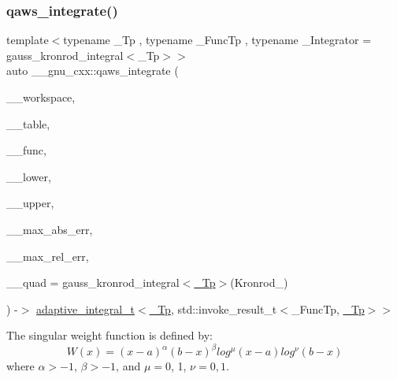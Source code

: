 \subsubsection{\texorpdfstring{qaws\+\_\+integrate()}{qaws\_integrate()}}
{\footnotesize\ttfamily template$<$typename \+\_\+\+Tp , typename \+\_\+\+Func\+Tp , typename \+\_\+\+Integrator  = gauss\+\_\+kronrod\+\_\+integral$<$\+\_\+\+Tp$>$$>$ \\
auto \+\_\+\+\_\+gnu\+\_\+cxx\+::qaws\+\_\+integrate (\begin{DoxyParamCaption}\item[{\hyperlink{class____gnu__cxx_1_1integration__workspace}{integration\+\_\+workspace}$<$ \hyperlink{namespace____gnu__cxx_a3b19a9c800ca194374ef9172290f7d79}{\+\_\+\+Tp}, std\+::invoke\+\_\+result\+\_\+t$<$ \+\_\+\+Func\+Tp, \hyperlink{namespace____gnu__cxx_a3b19a9c800ca194374ef9172290f7d79}{\+\_\+\+Tp} $>$$>$ \&}]{\+\_\+\+\_\+workspace,  }\item[{\hyperlink{struct____gnu__cxx_1_1qaws__integration__table}{qaws\+\_\+integration\+\_\+table}$<$ \hyperlink{namespace____gnu__cxx_a3b19a9c800ca194374ef9172290f7d79}{\+\_\+\+Tp} $>$ \&}]{\+\_\+\+\_\+table,  }\item[{\+\_\+\+Func\+Tp}]{\+\_\+\+\_\+func,  }\item[{\hyperlink{namespace____gnu__cxx_a3b19a9c800ca194374ef9172290f7d79}{\+\_\+\+Tp}}]{\+\_\+\+\_\+lower,  }\item[{\hyperlink{namespace____gnu__cxx_a3b19a9c800ca194374ef9172290f7d79}{\+\_\+\+Tp}}]{\+\_\+\+\_\+upper,  }\item[{\hyperlink{namespace____gnu__cxx_a3b19a9c800ca194374ef9172290f7d79}{\+\_\+\+Tp}}]{\+\_\+\+\_\+max\+\_\+abs\+\_\+err,  }\item[{\hyperlink{namespace____gnu__cxx_a3b19a9c800ca194374ef9172290f7d79}{\+\_\+\+Tp}}]{\+\_\+\+\_\+max\+\_\+rel\+\_\+err,  }\item[{\+\_\+\+Integrator}]{\+\_\+\+\_\+quad = {\ttfamily gauss\+\_\+kronrod\+\_\+integral$<$\hyperlink{namespace____gnu__cxx_a3b19a9c800ca194374ef9172290f7d79}{\+\_\+\+Tp}$>$(Kronrod\+\_)} }\end{DoxyParamCaption}) -\/$>$ \hyperlink{struct____gnu__cxx_1_1adaptive__integral__t}{adaptive\+\_\+integral\+\_\+t}$<$\hyperlink{namespace____gnu__cxx_a3b19a9c800ca194374ef9172290f7d79}{\+\_\+\+Tp}, std\+::invoke\+\_\+result\+\_\+t$<$\+\_\+\+Func\+Tp, \hyperlink{namespace____gnu__cxx_a3b19a9c800ca194374ef9172290f7d79}{\+\_\+\+Tp}$>$$>$
    }

The singular weight function is defined by\+: \[ W(x) = (x-a)^\alpha (b-x)^\beta log^\mu (x-a) log^\nu (b-x) \] where $ \alpha > -1 $, $ \beta > -1 $, and $ \mu = 0 $, 1, $ \nu = 0, 1 $.

